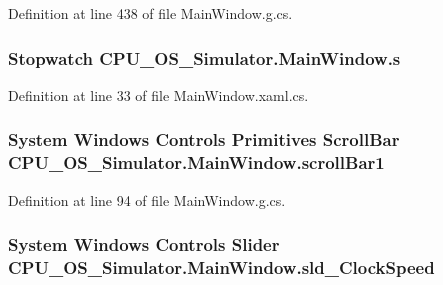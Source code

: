 Definition at line 438 of file Main\+Window.\+g.\+cs.

\hypertarget{class_c_p_u___o_s___simulator_1_1_main_window_a880dc01f7c4f093b77ace064d93be1f3}{}
\subsubsection[{s}]{\setlength{\rightskip}{0pt plus 5cm}Stopwatch C\+P\+U\+\_\+\+O\+S\+\_\+\+Simulator.\+Main\+Window.\+s\hspace{0.3cm}{\ttfamily [private]}}\label{class_c_p_u___o_s___simulator_1_1_main_window_a880dc01f7c4f093b77ace064d93be1f3}


Definition at line 33 of file Main\+Window.\+xaml.\+cs.

\hypertarget{class_c_p_u___o_s___simulator_1_1_main_window_a014812a0e9cd159be05250d94d9a5a8b}{}
\subsubsection[{scroll\+Bar1}]{\setlength{\rightskip}{0pt plus 5cm}System Windows Controls Primitives Scroll\+Bar C\+P\+U\+\_\+\+O\+S\+\_\+\+Simulator.\+Main\+Window.\+scroll\+Bar1\hspace{0.3cm}{\ttfamily [package]}}\label{class_c_p_u___o_s___simulator_1_1_main_window_a014812a0e9cd159be05250d94d9a5a8b}


Definition at line 94 of file Main\+Window.\+g.\+cs.

\hypertarget{class_c_p_u___o_s___simulator_1_1_main_window_a39cd3af9bb0f8a3ccd06fdd44c9ed6a3}{}
\subsubsection[{sld\+\_\+\+Clock\+Speed}]{\setlength{\rightskip}{0pt plus 5cm}System Windows Controls Slider C\+P\+U\+\_\+\+O\+S\+\_\+\+Simulator.\+Main\+Window.\+sld\+\_\+\+Clock\+Speed\hspace{0.3cm}{\ttfamily [package]}}\label{class_c_p_u___o_s___simulator_1_1_main_window_a39cd3af9bb0f8a3ccd06fdd44c9ed6a3}


